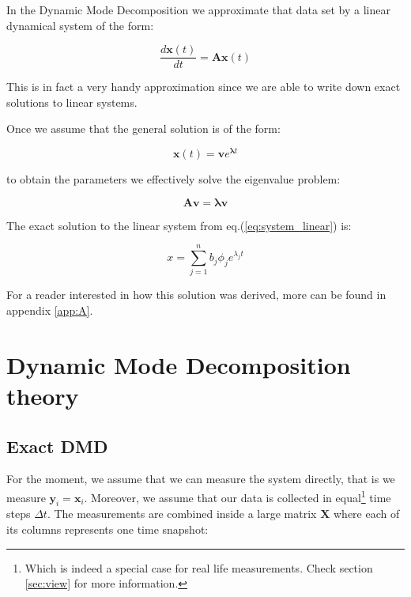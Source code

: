 \documentclass[10pt,twocolumn]{article}
\begin{document}
In the Dynamic Mode Decomposition we approximate that data set by a linear dynamical system of the form:

\begin{equation} \label{eq:system_linear}
\frac{d \mathbf{x}(t)}{dt} = \mathbf{A} \mathbf{x}(t)
\end{equation}

This is in fact a very handy approximation since we are able to write down exact solutions to linear systems.

Once we assume that the general solution is of the form:

\begin{equation} \label{eq:general_solution}
\mathbf{x}(t) = \mathbf{v} e^{\bm{\lambda} t}
\end{equation}

to obtain the parameters we effectively solve the eigenvalue problem:

\begin{equation} \label{eq:eigenvalue_solution}
\mathbf{A} \mathbf{v} = \bm{\lambda} \mathbf{v}
\end{equation}

The exact solution to the linear system from eq.(\ref{eq:system_linear}) is:

\begin{equation} \label{eq:soln_exact}
x = \sum_{j = 1}^{n} b_j \phi_j e^{\lambda_j t}
\end{equation}

For a reader interested in how this solution was derived, more can be found in appendix \ref{app:A}. 

\section{Dynamic Mode Decomposition theory}\label{sec:theory}

\subsection{Exact DMD}

For the moment, we assume that we can measure the system directly, that is we measure $\mathbf{y}_i = \mathbf{x}_i$. Moreover, we assume that our data is collected in equal\footnote{Which is indeed a special case for real life measurements. Check section \ref{sec:view} for more information.} time steps $\Delta t$. The measurements are combined inside a large matrix $\mathbf{X}$ where each of its columns represents one time snapshot:
\end{document}
